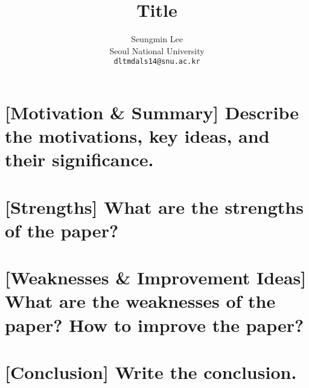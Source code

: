 \documentclass[final]{cvpr}
\begin{document}
\renewcommand{\arraystretch}{1.1}
\title{\Large Title}

\author{Seungmin Lee\\
Seoul National University\\
{\tt\small dltmdals14@snu.ac.kr}
}

\onecolumn
\maketitle

\section{[Motivation \& Summary] Describe the motivations, key ideas, and their significance.}

\section{[Strengths] What are the strengths of the paper?}

\section{[Weaknesses \& Improvement Ideas] What are the weaknesses of the paper? How to improve the paper?}

\section{[Conclusion] Write the conclusion.}


{\small
	
	
}
\end{document}
